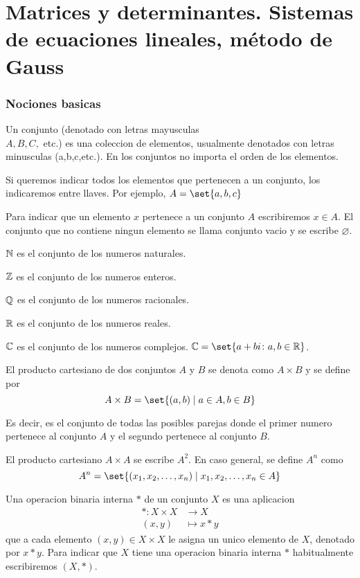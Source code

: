 \part{Matrices y determinantes. Sistemas de ecuaciones lineales, método de Gauss}

\section{Nociones basicas}
\begin{definition}
	Un conjunto (denotado con letras mayusculas \\ \(A,B,C,\) etc.)  es una coleccion de elementos, usualmente denotados con letras minusculas (a,b,c,etc.). En los conjuntos no importa el orden de los elementos.
\end{definition}
Si queremos indicar todos los elementos que pertenecen a un conjunto, los indicaremos entre llaves. Por ejemplo,  \(A = \set{a,b,c}\)

Para indicar que un elemento \(x \) pertenece a un conjunto \(A \) escribiremos \(x \in A\). El conjunto que no contiene ningun elemento se llama conjunto vacio y se escribe \(\varnothing\).

\begin{example}
	\(\mathbb{N} \) es el conjunto de los numeros naturales.

	\(\mathbb{Z}\) es el conjunto de los numeros enteros.

	\(\mathbb{Q} \) es el conjunto de los numeros racionales.

	\(\mathbb{R} \) es el conjunto de los numeros reales.

	\(\mathbb{C} \) es el conjunto de los numeros complejos. \(\C = \set{a+bi \colon a,b \in \R}\).
\end{example}

\begin{definition}
	El producto cartesiano de dos conjuntos \(A \) y \(B \) se denota como \(A \times B \) y se define por
	\[
		A \times B = \set{(a,b) \mid a \in A, b \in B}
	\]
\end{definition}
Es decir, es el conjunto de todas las posibles parejas donde el primer numero pertenece al conjunto \(A \) y el segundo pertenece al conjunto \(B \).

El producto cartesiano \(A \times A \) se escribe \(A^{2} \). En caso general, se define \(A^{n }\) como
\[
	A^{n} = \set{(x_1,x_2,\ldots,x_n) \mid x_1,x_2,\dots,x_n \in A}
\]

\begin{definition}
	Una operacion binaria interna \(* \) de un conjunto \(X\) es una aplicacion
	\[
		\begin{aligned}
			* \colon X \times X & \longrightarrow X \\
			(x,y )              & \longmapsto x * y
		\end{aligned}
	\]
	que a cada elemento \((x,y) \in X \times X \) le asigna un unico elemento de \(X \), denotado por \(x * y \). Para indicar que \(X \) tiene una operacion binaria interna \(* \) habitualmente escribiremos \((X, * )\).
\end{definition}

